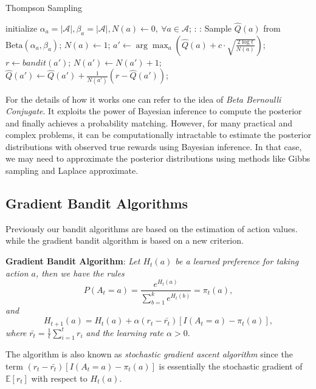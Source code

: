 \documentclass{progartcn}
\begin{document}
        	\begin{algorithm}[H]
			\caption{Thompson Sampling}
			\label{alg: ts}
			\begin{algorithmic}[1]
				\State initialize $\alpha_a = |\mathcal{A}|,\beta_a=|\mathcal{A}|, N(a)\gets0,\ \forall a\in\mathcal{A}$;
				:
				:
					\State Sample $\hat{Q}(a)$ from $\text{Beta}(\alpha_a,\beta_a)$;
					\State $N(a)\gets1$;
				\EndFor
					\State $a'\gets\arg\max_{a} \left(\hat{Q}(a)+c\cdot\sqrt{\frac{2\log t}{N(a)}}\right)$;
					\State $r\gets bandit(a')$;
					\State $N(a')\gets N(a')+1$;
					\State $\hat{Q}(a')\gets \hat{Q}(a')+\frac{1}{N(a')}(r-\hat{Q}(a'))$;
            	\EndFor
			\end{algorithmic}
			\end{algorithm}

        	For the details of how it works one can refer to the idea of \textit{Beta Bernoulli Conjugate}. It exploits the power of Bayesian inference to compute the posterior and finally achieves a probability matching. However, for many practical and complex problems, it can be computationally intractable to estimate the posterior distributions with observed true rewards using Bayesian inference. In that case, we may need to approximate the posterior distributions using methods like Gibbs sampling and Laplace approximate.\\

    \subsection{Gradient Bandit Algorithms}

        	Previously our bandit algorithms are based on the estimation of action values. while the gradient bandit algorithm is based on a new criterion.

        	\textbf{Gradient Bandit Algorithm}: \textit{Let $H_t(a)$ be a learned preference for taking action $a$, then we have the rules}
        	\[P(A_t=a)=\frac{e^{H_t(a)}}{\sum_{b=1}^k e^{H_t(b)}}=\pi_t(a),\]
        	\textit{and}
        	\[H_{t+1}(a)=H_t(a)+\alpha(r_t-\bar{r_t})[I(A_t=a)-\pi_t(a)],\]
        	\textit{where }$\bar{r_t}=\frac{1}{t}\sum_{i=1}^t r_i$ \textit{ and the learning rate $\alpha>0$}.

        	The algorithm is also known as \textit{stochastic gradient ascent algorithm} since the term $(r_t-\bar{r_t})[I(A_t=a)-\pi_t(a)]$ is essentially the stochastic gradient of $\mathbb{E}[r_t]$ with respect to $H_t(a)$.
\end{document}
